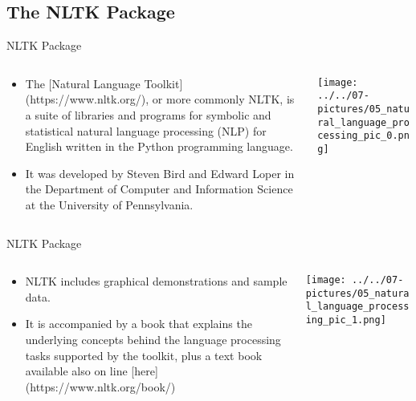\documentclass[11pt]{beamer}
\begin{document}
\subsection{The NLTK Package \\ \scalebox{0.8}{}}
\begin{frame}{NLTK Package}
\begin{columns}[T] %
\begin{column}{.48\textwidth}
        \begin{itemize}
		\item The [Natural Language Toolkit](https://www.nltk.org/), or more commonly NLTK, is a suite of libraries and programs for symbolic and statistical natural language processing (NLP) for English written in the Python programming language.
		\item It was developed by Steven Bird and Edward Loper in the Department of Computer and Information Science at the University of Pennsylvania.
        \end{itemize}
\end{column}%
\hfill%
\begin{column}{.48\textwidth}
        \texttt{[image: ../../07-pictures/05\_natural\_language\_processing\_pic\_0.png]}
\end{column}%
\end{columns}
\end{frame}
\begin{frame}{NLTK Package}
\begin{columns}[T] %
\begin{column}{.48\textwidth}
        \begin{itemize}
		\item NLTK includes graphical demonstrations and sample data. 
		\item It is accompanied by a book that explains the underlying concepts behind the language processing tasks supported by the toolkit, plus a text book available also on line [here](https://www.nltk.org/book/)
        \end{itemize}
\end{column}%
\hfill%
\begin{column}{.48\textwidth}
        \texttt{[image: ../../07-pictures/05\_natural\_language\_processing\_pic\_1.png]}
\end{column}%
\end{columns}
\end{frame}
\end{document}
